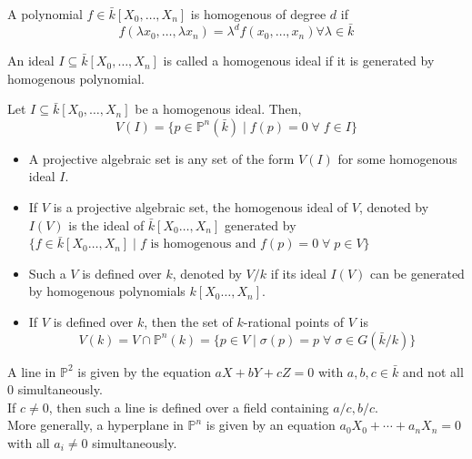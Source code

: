 \documentclass[oneside, 12pt]{scrbook}
\theoremstyle{theorem}
\begin{document}
\begin{definition}
A polynomial $f \in \bar{k}[X_{0}, \hdots , X_{n}]$ is homogenous of degree $d$ if $$f(\lambda x_{0} , \hdots , \lambda x_{n})  = \lambda^d f(x_{0} , \hdots ,x_{n}) \forall \lambda \in \bar{k}$$
\end{definition}

\begin{definition}
An ideal $I \subseteq \bar{k}[X_{0} , \hdots , X_{n}]$ is called a homogenous ideal if it is generated by homogenous polynomial.  
\end{definition}

\begin{definition}
Let $I \subseteq \bar{k}[X_{0} , \hdots , X_{n}]$ be a homogenous ideal. Then, $$V(I) = \{p \in \mathbb{P}^n (\bar{k}) \mid f(p)=0 \; \forall \; f\in I\}$$
\end{definition}

\begin{definition}
\begin{itemize}
\item A projective algebraic set is any set of the form $V(I)$ for some homogenous ideal $I$. 
\item If $V$ is a projective algebraic set, the homogenous ideal of $V$, denoted by $I(V)$ is the ideal of $\bar{k}[X_{0} \hdots , X_{n}]$ generated by $\{f \in \bar{k}[X_{0} \hdots , X_{n}]\mid f \text{ is homogenous and }f(p)= 0 \; \forall \; p\in V\}$
\item Such a $V$ is defined over $k$, denoted by $V/k$ if its ideal $I(V)$ can be generated by homogenous polynomials $k[X_{0} \hdots , X_{n}]$. 
\item If $V$ is defined over $k$, then the set of $k$-rational points of $V$ is $$V(k) = V \cap \mathbb{P}^{n}(k) = \{p \in V \mid \sigma(p)=p \; \forall \; \sigma \in G(\bar{k}/k)\}$$
\end{itemize}
\end{definition}

\begin{example}
A line in $\mathbb{P}^2$ is given by the equation $aX + bY + cZ=0$ with $a,b,c \in \bar{k}$ and not all $0$ simultaneously. \\
If $c\neq 0$, then such a line is defined over a field containing $a/c, b/c$. \\
More generally, a hyperplane in $\mathbb{P}^n$ is given by an equation $a_{0}X_{0} + \cdots + a_{n}X_{n} = 0$ with all $a_{i} \neq 0$ simultaneously.
\end{example}
\end{document}
